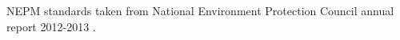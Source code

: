\label{fig:nepm}
NEPM standards taken from National Environment Protection Council annual report 2012-2013 \cite{nepc_annuals}.